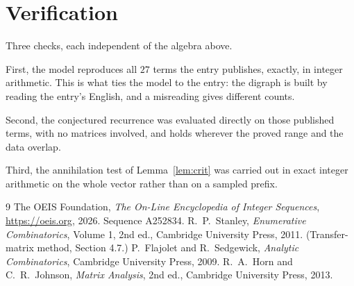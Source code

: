 \documentclass[11pt,a4paper]{article}
\theoremstyle{plain}
\theoremstyle{definition}
\begin{document}
\section{Verification}

Three checks, each independent of the algebra above.

First, the model reproduces all $27$ terms the entry publishes, exactly, in integer
arithmetic. This is what ties the model to the entry: the digraph is built by reading the
entry's English, and a misreading gives different counts.

Second, the conjectured recurrence was evaluated directly on those published terms, with no
matrices involved, and holds wherever the proved range and the data overlap.

Third, the annihilation test of Lemma~\ref{lem:crit} was carried out in exact integer
arithmetic on the whole vector rather than on a sampled prefix.

\begin{thebibliography}{9}
 The OEIS Foundation, \emph{The On-Line Encyclopedia of Integer
Sequences}, \url{https://oeis.org}, 2026. Sequence A252834.
 R.~P.~Stanley, \emph{Enumerative Combinatorics}, Volume 1, 2nd ed.,
Cambridge University Press, 2011. (Transfer-matrix method, Section 4.7.)
 P.~Flajolet and R.~Sedgewick, \emph{Analytic Combinatorics}, Cambridge
University Press, 2009.
 R.~A.~Horn and C.~R.~Johnson, \emph{Matrix Analysis}, 2nd ed., Cambridge
University Press, 2013.
\end{thebibliography}
\end{document}
